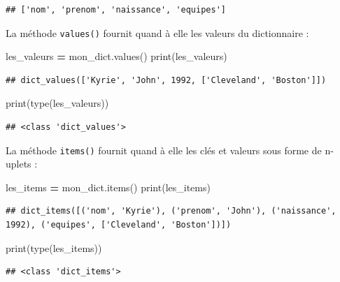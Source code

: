 \documentclass[12pt,]{book}
\newenvironment{Shaded}{\begin{snugshade}}{\end{snugshade}}
\newcommand{\OperatorTok}[1]{\textcolor[rgb]{0.81,0.36,0.00}{\textbf{#1}}}
\newcommand{\BuiltInTok}[1]{#1}
\newcommand{\NormalTok}[1]{#1}
\numberwithin{equation}{section}
\numberwithin{countremarque}{section}
\begin{document}
\begin{lstlisting}
## ['nom', 'prenom', 'naissance', 'equipes']
\end{lstlisting}

La méthode \texttt{values()} fournit quand à elle les valeurs du
dictionnaire :

\begin{Shaded}
\begin{Highlighting}[]
\NormalTok{les_valeurs }\OperatorTok{=}\NormalTok{ mon_dict.values()}
\BuiltInTok{print}\NormalTok{(les_valeurs)}
\end{Highlighting}
\end{Shaded}

\begin{lstlisting}
## dict_values(['Kyrie', 'John', 1992, ['Cleveland', 'Boston']])
\end{lstlisting}

\begin{Shaded}
\begin{Highlighting}[]
\BuiltInTok{print}\NormalTok{(}\BuiltInTok{type}\NormalTok{(les_valeurs))}
\end{Highlighting}
\end{Shaded}

\begin{lstlisting}
## <class 'dict_values'>
\end{lstlisting}

La méthode \texttt{items()} fournit quand à elle les clés et valeurs
sous forme de n-uplets :

\begin{Shaded}
\begin{Highlighting}[]
\NormalTok{les_items }\OperatorTok{=}\NormalTok{ mon_dict.items()}
\BuiltInTok{print}\NormalTok{(les_items)}
\end{Highlighting}
\end{Shaded}

\begin{lstlisting}
## dict_items([('nom', 'Kyrie'), ('prenom', 'John'), ('naissance', 1992), ('equipes', ['Cleveland', 'Boston'])])
\end{lstlisting}

\begin{Shaded}
\begin{Highlighting}[]
\BuiltInTok{print}\NormalTok{(}\BuiltInTok{type}\NormalTok{(les_items))}
\end{Highlighting}
\end{Shaded}

\begin{lstlisting}
## <class 'dict_items'>
\end{lstlisting}
\end{document}
